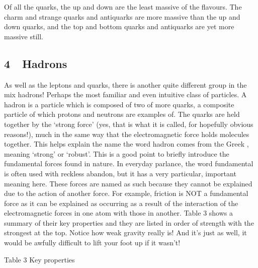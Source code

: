 \documentclass[letterpaper,10pt,english]{sphinxmanual}
\begin{document}
Of all the quarks, the up and down are the least massive of the flavours. The charm and strange quarks and antiquarks are more massive than the up and down quarks, and the top and bottom quarks and antiquarks are yet more massive still.


\subsection{4  Hadrons}
\label{\detokenize{content/session_00/Part_00_04:4_xa0_xa0Hadrons}}\label{\detokenize{content/session_00/Part_00_04::doc}}
As well as the leptons and quarks, there is another quite different group in the mix \sphinxhyphen{} hadrons! Perhaps the most familiar and even intuitive class of particles. A hadron is a particle which is composed of two of more quarks, a composite particle of which protons and neutrons are examples of. The quarks are held together by the ‘strong force’ (yes, that is what it is called, for hopefully obvious reasons!), much in the same way that the electromagnetic force holds molecules together. This helps
explain the name\sphinxhyphen{} the word hadron comes from the Greek , meaning ‘strong’ or ‘robust’. This is a good point to briefly introduce the fundamental forces found in nature. In everyday parlance, the word fundamental is often used with reckless abandon, but it has a very particular, important meaning here. These forces are named as such because they cannot be explained due to the action of another force. For example, friction is NOT a fundamental force as it can be explained as occurring as a
result of the interaction of the electromagnetic forces in one atom with those in another. Table 3 shows a summary of their key properties and they are listed in order of strength with the strongest at the top. Notice how weak gravity really is! And it’s just as well, it would be awfully difficult to lift your foot up if it wasn’t!





Table 3 Key properties














\end{document}
